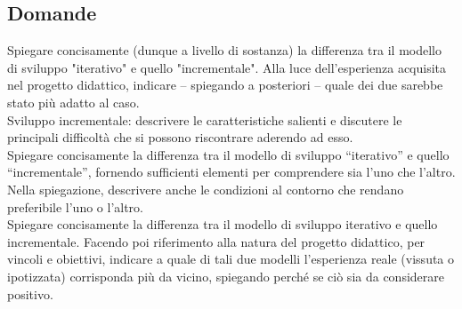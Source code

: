 \subsection*{Domande}
Spiegare concisamente (dunque a livello di sostanza) la differenza tra il modello di sviluppo "iterativo" e quello "incrementale". 
Alla luce dell'esperienza acquisita nel progetto didattico, indicare – spiegando a posteriori – quale dei due sarebbe stato più adatto al caso.\\

Sviluppo incrementale: descrivere le caratteristiche salienti e discutere le principali difficoltà che si possono riscontrare aderendo ad esso.\\ 

Spiegare concisamente la differenza tra il modello di sviluppo “iterativo” e quello “incrementale”, fornendo sufficienti elementi per comprendere sia l'uno che l'altro.
Nella spiegazione, descrivere anche le condizioni al contorno che rendano preferibile l'uno o l'altro. \\

Spiegare concisamente la differenza tra il modello di sviluppo iterativo e quello incrementale.
Facendo poi riferimento alla natura del progetto didattico, per vincoli e obiettivi, indicare a quale di tali due modelli l'esperienza reale (vissuta o ipotizzata) corrisponda più da vicino, spiegando perché se ciò sia da considerare positivo. 

